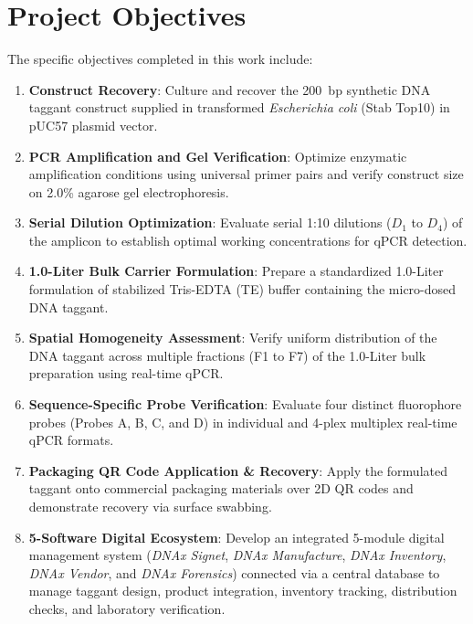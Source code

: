 \section{Project Objectives}
The specific objectives completed in this work include:

\begin{enumerate}
    \item \textbf{Construct Recovery}: Culture and recover the 200~bp synthetic DNA taggant construct supplied in transformed \textit{Escherichia coli} (Stab Top10) in pUC57 plasmid vector.
    \item \textbf{PCR Amplification and Gel Verification}: Optimize enzymatic amplification conditions using universal primer pairs and verify construct size on 2.0\% agarose gel electrophoresis.
    \item \textbf{Serial Dilution Optimization}: Evaluate serial 1:10 dilutions ($D_1$ to $D_4$) of the amplicon to establish optimal working concentrations for qPCR detection.
    \item \textbf{1.0-Liter Bulk Carrier Formulation}: Prepare a standardized 1.0-Liter formulation of stabilized Tris-EDTA (TE) buffer containing the micro-dosed DNA taggant.
    \item \textbf{Spatial Homogeneity Assessment}: Verify uniform distribution of the DNA taggant across multiple fractions (F1 to F7) of the 1.0-Liter bulk preparation using real-time qPCR.
    \item \textbf{Sequence-Specific Probe Verification}: Evaluate four distinct fluorophore probes (Probes A, B, C, and D) in individual and 4-plex multiplex real-time qPCR formats.
    \item \textbf{Packaging QR Code Application \& Recovery}: Apply the formulated taggant onto commercial packaging materials over 2D QR codes and demonstrate recovery via surface swabbing.
    \item \textbf{5-Software Digital Ecosystem}: Develop an integrated 5-module digital management system (\textit{DNAx Signet}, \textit{DNAx Manufacture}, \textit{DNAx Inventory}, \textit{DNAx Vendor}, and \textit{DNAx Forensics}) connected via a central database to manage taggant design, product integration, inventory tracking, distribution checks, and laboratory verification.
\end{enumerate}

